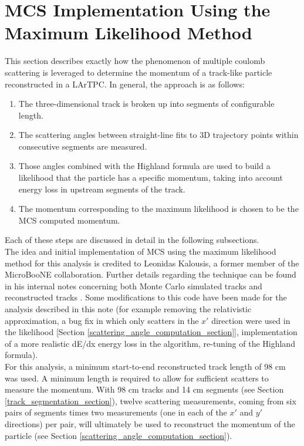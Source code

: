 \section{MCS Implementation Using the Maximum Likelihood Method}\label{MCS_technique_section}

This section describes exactly how the phenomenon of multiple coulomb scattering is leveraged to determine the momentum of a track-like particle reconstructed in a LArTPC. In general, the approach is as follows:
\begin{enumerate}
\item The three-dimensional track is broken up into segments of configurable length.
\item The scattering angles between straight-line fits to 3D trajectory points within consecutive segments are measured.
\item Those angles combined with the Highland formula are used to build a likelihood that the particle has a specific momentum, taking into account energy loss in upstream segments of the track.
\item The momentum corresponding to the maximum likelihood is chosen to be the MCS computed momentum.
\end{enumerate}
Each of these steps are discussed in detail in the following subsections.\\

The idea and initial implementation of MCS using the maximum likelihood method for this analysis is credited to Leonidas Kalousis, a former member of the MicroBooNE collaboration. Further details regarding the technique can be found in his internal notes concerning both Monte Carlo simulated tracks \cite{leonidas1} and reconstructed tracks \cite{leonidas2}. Some modifications to this code have been made for the analysis described in this note (for example removing the relativistic approximation, a bug fix in which only scatters in the $x'$ direction were used in the likelihood [Section \ref{scattering_angle_computation_section}], implementation of a more realistic dE/dx energy loss in the algorithm, re-tuning of the Highland formula).\\

For this analysis, a minimum start-to-end reconstructed track length of 98 cm was used. A minimum length is required to allow for sufficient scatters to measure the momentum. With 98 cm tracks and 14 cm segments (see Section \ref{track_segmentation_section}), twelve scattering measurements, coming from six pairs of segments times two measurements (one in each of the $x'$ and $y'$ directions) per pair, will ultimately be used to reconstruct the momentum of the particle (see Section \ref{scattering_angle_computation_section}).

